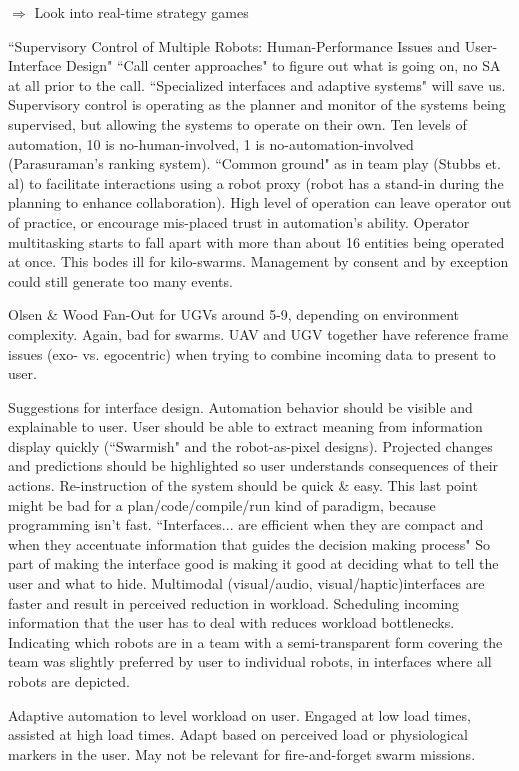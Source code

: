 \documentclass[]{article}
\begin{document}
$\Rightarrow$ Look into real-time strategy games 

``Supervisory Control of Multiple Robots: Human-Performance Issues and User-Interface Design" \cite{chen2011supervisory} ``Call center approaches" to figure out what is going on, no SA at all prior to the call. ``Specialized interfaces and adaptive systems" will save us. Supervisory control is operating as the planner and monitor of the systems being supervised, but allowing the systems to operate on their own. Ten levels of automation, 10 is no-human-involved, 1 is no-automation-involved (Parasuraman's ranking system). ``Common ground" as in team play (Stubbs et. al) to facilitate interactions using a robot proxy (robot has a stand-in during the planning to enhance collaboration). High level of operation can leave operator out of practice, or encourage mis-placed trust in automation's ability. Operator multitasking starts to fall apart with more than about 16 entities being operated at once. This bodes ill for kilo-swarms. Management by consent and by exception could still generate too many events. 

Olsen \& Wood Fan-Out for UGVs around 5-9, depending on environment complexity. Again, bad for swarms. UAV and UGV together have reference frame issues (exo- vs. egocentric) when trying to combine incoming data to present to user. 

Suggestions for interface design. Automation behavior should be visible and explainable to user. User should be able to extract meaning from information display quickly (``Swarmish" and the robot-as-pixel designs). Projected changes and predictions should be highlighted so user understands consequences of their actions. Re-instruction of the system should be quick \& easy. This last point might be bad for a plan/code/compile/run kind of paradigm, because programming isn't fast. ``Interfaces... are efficient when they are compact and when they accentuate information that guides the decision making process" So part of making the interface good is making it good at deciding what to tell the user and what to hide. Multimodal (visual/audio, visual/haptic)interfaces are faster and result in perceived reduction in workload. Scheduling incoming information that the user has to deal with reduces workload bottlenecks. Indicating which robots are in a team with a semi-transparent form covering the team was slightly preferred by user to individual robots, in interfaces where all robots are depicted. 

Adaptive automation to level workload on user. Engaged at low load times, assisted at high load times. Adapt based on perceived load or physiological markers in the user. May not be relevant for fire-and-forget swarm missions. 
\end{document}
